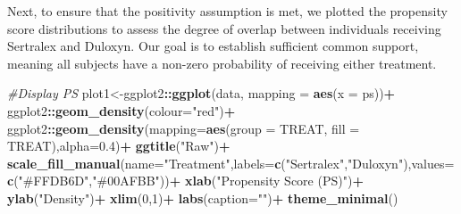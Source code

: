 \documentclass[
]{book}
\newenvironment{Shaded}{\begin{snugshade}}{\end{snugshade}}
\newcommand{\AttributeTok}[1]{\textcolor[rgb]{0.13,0.29,0.53}{#1}}
\newcommand{\CommentTok}[1]{\textcolor[rgb]{0.56,0.35,0.01}{\textit{#1}}}
\newcommand{\DecValTok}[1]{\textcolor[rgb]{0.00,0.00,0.81}{#1}}
\newcommand{\FloatTok}[1]{\textcolor[rgb]{0.00,0.00,0.81}{#1}}
\newcommand{\FunctionTok}[1]{\textcolor[rgb]{0.13,0.29,0.53}{\textbf{#1}}}
\newcommand{\NormalTok}[1]{#1}
\newcommand{\OtherTok}[1]{\textcolor[rgb]{0.56,0.35,0.01}{#1}}
\newcommand{\SpecialCharTok}[1]{\textcolor[rgb]{0.81,0.36,0.00}{\textbf{#1}}}
\newcommand{\StringTok}[1]{\textcolor[rgb]{0.31,0.60,0.02}{#1}}
\begin{document}
Next, to ensure that the positivity assumption is met, we plotted the
propensity score distributions to assess the degree of overlap between
individuals receiving Sertralex and Duloxyn. Our goal is to establish
sufficient common support, meaning all subjects have a non-zero
probability of receiving either treatment.

\begin{Shaded}
\begin{Highlighting}[]
\CommentTok{\#Display PS}
\NormalTok{plot1}\OtherTok{\textless{}{-}}\NormalTok{ggplot2}\SpecialCharTok{::}\FunctionTok{ggplot}\NormalTok{(data, }\AttributeTok{mapping =} \FunctionTok{aes}\NormalTok{(}\AttributeTok{x =}\NormalTok{ ps))}\SpecialCharTok{+}
\NormalTok{  ggplot2}\SpecialCharTok{::}\FunctionTok{geom\_density}\NormalTok{(}\AttributeTok{colour=}\StringTok{"red"}\NormalTok{)}\SpecialCharTok{+}
\NormalTok{  ggplot2}\SpecialCharTok{::}\FunctionTok{geom\_density}\NormalTok{(}\AttributeTok{mapping=}\FunctionTok{aes}\NormalTok{(}\AttributeTok{group =}\NormalTok{ TREAT, }\AttributeTok{fill =}\NormalTok{ TREAT),}\AttributeTok{alpha=}\FloatTok{0.4}\NormalTok{)}\SpecialCharTok{+}
  \FunctionTok{ggtitle}\NormalTok{(}\StringTok{"Raw"}\NormalTok{)}\SpecialCharTok{+}
  \FunctionTok{scale\_fill\_manual}\NormalTok{(}\AttributeTok{name=}\StringTok{"Treatment"}\NormalTok{,}\AttributeTok{labels=}\FunctionTok{c}\NormalTok{(}\StringTok{"Sertralex"}\NormalTok{,}\StringTok{"Duloxyn"}\NormalTok{),}\AttributeTok{values=}\FunctionTok{c}\NormalTok{(}\StringTok{"\#FFDB6D"}\NormalTok{,}\StringTok{"\#00AFBB"}\NormalTok{))}\SpecialCharTok{+}
  \FunctionTok{xlab}\NormalTok{(}\StringTok{"Propensity Score (PS)"}\NormalTok{)}\SpecialCharTok{+}
  \FunctionTok{ylab}\NormalTok{(}\StringTok{"Density"}\NormalTok{)}\SpecialCharTok{+}
  \FunctionTok{xlim}\NormalTok{(}\DecValTok{0}\NormalTok{,}\DecValTok{1}\NormalTok{)}\SpecialCharTok{+}
  \FunctionTok{labs}\NormalTok{(}\AttributeTok{caption=}\StringTok{""}\NormalTok{)}\SpecialCharTok{+}
  \FunctionTok{theme\_minimal}\NormalTok{()}
  

\end{Highlighting}
\end{Shaded}
\end{document}
